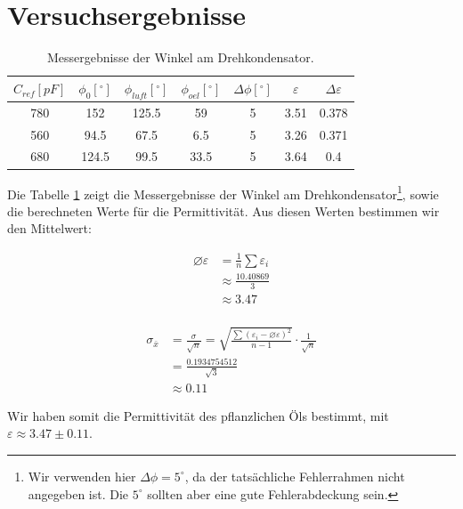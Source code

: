 \documentclass[10pt,a4paper]{article}
\begin{document}
\section{Versuchsergebnisse}
\begin{flushleft}
\begin{table}[H]
\centering
\caption{Messergebnisse der Winkel am Drehkondensator.}
\label{tab:messerg}
\begin{tabular}{|c|c|c|c|c|c|c|}
\hline
\textbf{$C_{ref} [pF]$} & \textbf{$\phi_0 [^{\circ}]$} & \textbf{$\phi_{luft} [^{\circ}]$} & \textbf{$\phi_{oel} [^{\circ}]$} & \textbf{$\Delta \phi [^{\circ}]$} & \textbf{$\varepsilon$} & \textbf{$\Delta \varepsilon$} \\
\hline
780 & 152 & 125.5 & 59 & 5 & 3.51 & 0.378 \\ 
\hline
560 & 94.5 & 67.5 & 6.5 & 5 & 3.26 & 0.371 \\ 
\hline
680 & 124.5 & 99.5 & 33.5 & 5 & 3.64 & 0.4 \\ 
\hline
\end{tabular}
\end{table}
Die Tabelle \ref{tab:messerg} zeigt die Messergebnisse der Winkel am Drehkondensator\footnote{Wir verwenden hier $\Delta \phi = 5^{\circ}$, da der tatsächliche Fehlerrahmen nicht angegeben ist. Die $5^{\circ}$ sollten aber eine gute Fehlerabdeckung sein.}, sowie die berechneten Werte für die Permittivität. Aus diesen Werten bestimmen wir den Mittelwert:
\begin{figure}[H]
\centering
\begin{subfigure}[c]{0.5\textwidth}
\begin{align*}
\varnothing \varepsilon &= \frac{1}{n} \sum \varepsilon_i \\
&\approx \frac{10.40869}{3} \\
&\approx 3.47 \\
\end{align*}
\end{subfigure}%
\begin{subfigure}[c]{0.5\textwidth}
\begin{align*}
\sigma_{\bar{x}} &= \frac{\sigma}{\sqrt{n}} = \sqrt{\frac{\sum(\varepsilon_i - \varnothing \varepsilon)^2}{n-1}} \cdot \frac{1}{\sqrt{n}} \\
&= \frac{0.1934754512}{\sqrt{3}} \\
&\approx 0.11
\end{align*}
\end{subfigure}%
\end{figure}
Wir haben somit die Permittivität des pflanzlichen Öls bestimmt, mit $\varepsilon \approx 3.47 \pm 0.11$.
\end{flushleft}
\end{document}
